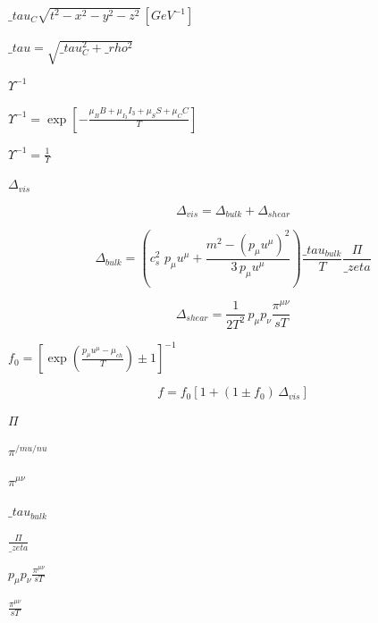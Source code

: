\documentclass{article}
\begin{document}
$ \_tau _C \sqrt{t^2 - x^2 - y^2 - z^2} \,[GeV^{-1}] $
\pagebreak

$ \_tau  = \sqrt{\_tau _C^2 + \_rho^2} $
\pagebreak

$ \Upsilon^{-1} $
\pagebreak

$ \Upsilon^{-1} = \exp \left[ - \frac{\mu_B B + \mu_{I_3} I_3 + \mu_S S + \mu_C C}{T}\right] $
\pagebreak

$ \Upsilon^{-1} = \frac{1}{\Upsilon} $
\pagebreak

$ \Delta_{vis} $
\pagebreak

\begin{equation}  \Delta_{vis} = \Delta_{bulk} + \Delta_{shear} \nonumber
\end{equation}
\pagebreak

\begin{equation}  \Delta_{bulk} = \left( c_s^2 \,\, p_\mu u^\mu + \frac{m^2 - (p_\mu u^\mu)^2}{3 \, p_\mu u^\mu}\right) \frac{\_tau _{bulk}}{T} \frac{\Pi}{\_zeta} \nonumber
\end{equation}
\pagebreak

\begin{equation}  \Delta_{shear} = \frac{1}{2 T^2}\, p_\mu p_\nu \frac{\pi^{\mu\nu}}{s T} \nonumber
\end{equation}
\pagebreak

$ f_0 = \left[ \exp \left( \frac{p_\mu u^\mu - \mu_{ch}}{T}\right) \pm 1 \right]^{-1} $
\pagebreak

\begin{equation}  f = f_0 \left[ 1 + \left(1 \pm f_0\right) \, \Delta_{vis} \right] \nonumber
\end{equation}
\pagebreak

$ \Pi $
\pagebreak

$ \pi^{/mu/nu} $
\pagebreak

$ \pi^{\mu\nu} $
\pagebreak

$ \_tau _{bulk} $
\pagebreak

$ \frac{\Pi}{\_zeta} $
\pagebreak

$ p_\mu p_\nu \frac{\pi^{\mu\nu}}{s T} $
\pagebreak

$ \frac{\pi^{\mu\nu}}{s T} $
\pagebreak
\end{document}
